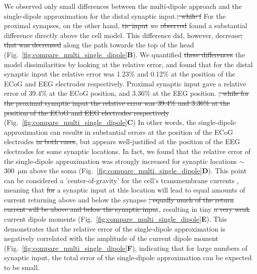\documentclass[preprint,10pt,authoryear]{elsarticle}
\newcommand{\hlg}[2][Emerald]{ {\sethlcolor{#1} \hl{#2}} }
\newcommand{\sntxt}[1]{{\color{NavyBlue}#1}}
\newcommand{\tvnnote}[1]{\color{white}{\hlg{TVN: #1 }}\color{black}}
\begin{document}
We observed only small differences between the multi-dipole approach and the single-dipole approximation for the distal synaptic input\sntxt{.\sout{, while f} F}or the proximal synap\sntxt{ses, on the other hand, \sout{tic input}} we \sntxt{\sout{observed} found} a substantial difference directly above the cell model\sntxt{. This difference did, however, decrease\sout{, that was decreased}} along the path towards the top of the head (Fig.~\ref{fig:compare_multi_single_dipole}\textbf{B}). We quantified \sntxt{\sout{these differences} the model dissimilarities} by looking at the relative error, and found that for the distal synaptic input the relative error was 1.23\% and 0.12\% at the position of the ECoG and EEG electrodes respectively\sntxt{. Proximal synaptic input gave a relative error of 39.4$\%$ at the ECoG position, and 3.36$\%$ at the EEG position. \sout{, while for the proximal synaptic input the relative error was 39.4\% and 3.36\% at the position of the ECoG and EEG electrodes respectively}} (Fig.~\ref{fig:compare_multi_single_dipole}\textbf{C})
In other words, the single-dipole approximation \sntxt{can} result\sntxt{\sout{s}} in substantial errors at the position of the ECoG electrodes \sntxt{\sout{in both cases}}, but appears well-justified at the position of the EEG electrodes for some synaptic locations. In fact, we found that the relative error of the single-dipole approximation was strongly increased for synaptic locations $\sim$ 300~$\si{\um}$ above the soma (Fig.~\ref{fig:compare_multi_single_dipole}\textbf{D}). 
This point can be considered a 'center-of-gravity' for the cell's transmembrane currents \citep{LINDEN2010, AHLFORS2015}, meaning that \sntxt{\sout{for}} a synaptic input at this location \sntxt{will lead to equal amounts of current returning above and below the synapse \sout{, equally much of the return current will be above and below the synaptic inpu}}t, resulting in \sntxt{tiny \sout{a very weak}} current dipole moments (Fig.~\ref{fig:compare_multi_single_dipole}\textbf{E}).
This demonstrates that the relative error of the single-dipole approximation is negatively correlated with the amplitude of the current dipole moment (Fig.~\ref{fig:compare_multi_single_dipole}\textbf{F}), indicating that for large numbers of synaptic input, the total error of the single-dipole approximation can be expected to be small.
\end{document}
